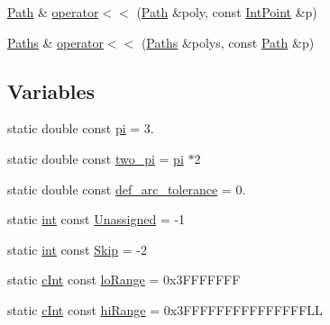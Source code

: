 \begin{DoxyCompactItemize}
\item 
\mbox{\hyperlink{namespace_clipper_lib_af39c8fe00f278f18cc8142fef41242da}{Path}} \& \mbox{\hyperlink{namespace_clipper_lib_a7783da3ed1c2354e45db83cecc596c7e}{operator$<$$<$}} (\mbox{\hyperlink{namespace_clipper_lib_af39c8fe00f278f18cc8142fef41242da}{Path}} \&poly, const \mbox{\hyperlink{struct_clipper_lib_1_1_int_point}{Int\+Point}} \&p)
\item 
\mbox{\hyperlink{namespace_clipper_lib_a4bab1d9e10805fa6f1fd3b78c56efcfe}{Paths}} \& \mbox{\hyperlink{namespace_clipper_lib_aa0bb38565ca4b15c637b38f476d21036}{operator$<$$<$}} (\mbox{\hyperlink{namespace_clipper_lib_a4bab1d9e10805fa6f1fd3b78c56efcfe}{Paths}} \&polys, const \mbox{\hyperlink{namespace_clipper_lib_af39c8fe00f278f18cc8142fef41242da}{Path}} \&p)
\end{DoxyCompactItemize}
\subsection*{Variables}
\begin{DoxyCompactItemize}
\item 
static double const \mbox{\hyperlink{namespace_clipper_lib_a3226215bdfa5b0d7f01e40fc8f131485}{pi}} = 3.
\item 
static double const \mbox{\hyperlink{namespace_clipper_lib_afdf9089a4f64d08fe88fa1b075fa6a71}{two\+\_\+pi}} = \mbox{\hyperlink{namespace_clipper_lib_a3226215bdfa5b0d7f01e40fc8f131485}{pi}} $\ast$2
\item 
static double const \mbox{\hyperlink{namespace_clipper_lib_ab44dd4f071b7d92294a2af242e8c70d4}{def\+\_\+arc\+\_\+tolerance}} = 0.
\item 
static \mbox{\hyperlink{draw_8hh_aa620a13339ac3a1177c86edc549fda9b}{int}} const \mbox{\hyperlink{namespace_clipper_lib_ae8c8149f9414a1459f7691ecd2f94669}{Unassigned}} = -\/1
\item 
static \mbox{\hyperlink{draw_8hh_aa620a13339ac3a1177c86edc549fda9b}{int}} const \mbox{\hyperlink{namespace_clipper_lib_a6e9f2a3266e14dced8a5fee78224c1bf}{Skip}} = -\/2
\item 
static \mbox{\hyperlink{namespace_clipper_lib_a7156730a24951629192d4831334bafaa}{c\+Int}} const \mbox{\hyperlink{namespace_clipper_lib_abc3cf08ce02b48ae18c320fd492108f1}{lo\+Range}} = 0x3\+F\+F\+F\+F\+F\+FF
\item 
static \mbox{\hyperlink{namespace_clipper_lib_a7156730a24951629192d4831334bafaa}{c\+Int}} const \mbox{\hyperlink{namespace_clipper_lib_a65945fbc810bff7fd44c981b06e4473e}{hi\+Range}} = 0x3\+F\+F\+F\+F\+F\+F\+F\+F\+F\+F\+F\+F\+F\+F\+F\+LL
\end{DoxyCompactItemize}


